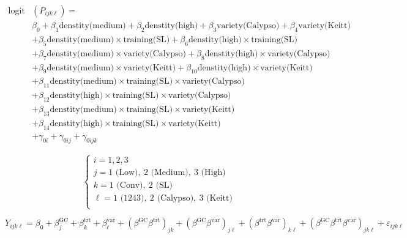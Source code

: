 \documentclass[a4paper, landscape, 11pt]{article}
\begin{document}
\newpage

\begin{align*}
 \text{logit}&\left( P_{ijk\ell} \right) =\\
 &\beta_0 +\beta_1 \text{denstity(medium)} + \beta_2 \text{denstity(high)} +\beta_3 \text{variety(Calypso)}  +\beta_4 \text{variety(Keitt)} \\
 &+\beta_5 \text{denstity(medium)} \times \text{training(SL)}  +\beta_6 \text{denstity(high)} \times \text{training(SL)}\\
 &+\beta_7 \text{denstity(medium)} \times \text{variety(Calypso)} +\beta_8 \text{denstity(high)} \times \text{variety(Calypso)}\\
 &+\beta_9 \text{denstity(medium)} \times \text{variety(Keitt)} +\beta_{10} \text{denstity(high)} \times \text{variety(Keitt)}\\
 & +\beta_{11} \text{denstity(medium)} \times \text{training(SL)} \times \text{variety(Calypso)} \\
 & +\beta_{12} \text{denstity(high)} \times \text{training(SL)} \times \text{variety(Calypso)} \\
 & +\beta_{13} \text{denstity(medium)} \times \text{training(SL)} \times \text{variety(Keitt)} \\
 & +\beta_{14} \text{denstity(high)} \times \text{training(SL)} \times \text{variety(Keitt)} \\
 & +\gamma_{0i} + \gamma_{0ij} + \gamma_{0ijk} 
\end{align*}

\newpage

\[
\begin{cases}
 i = 1, 2, 3\\
 j = 1 \text{ (Low)},\ 2 \text{ (Medium)},\ 3 \text{ (High)}\\
 k = 1\text{ (Conv)},\ 2\text{ (SL)}\\
 \ell = 1 \text{ (1243)},\ 2 \text{ (Calypso)}, \ 3 \text{ (Keitt)}\\
\end{cases}
\]

\newpage


\[
Y_{ijk\ell} = \beta_0 + \beta_j^{\text{GC}} + \beta_k^{\text{trt}} + \beta_\ell^{\text{var}} + \left( \beta^{\text{GC}}\beta^{\text{trt}} \right)_{jk} + \left( \beta^{\text{GC}}\beta^{\text{var}} \right)_{j\ell}
+ \left( \beta^{\text{trt}}\beta^{\text{var}} \right)_{k\ell} + \left( \beta^{\text{GC}}\beta^{\text{trt}}\beta^{\text{var}} \right)_{jk\ell} + \varepsilon_{ijk\ell}
\]

\vspace*{3cm}
\end{document}
